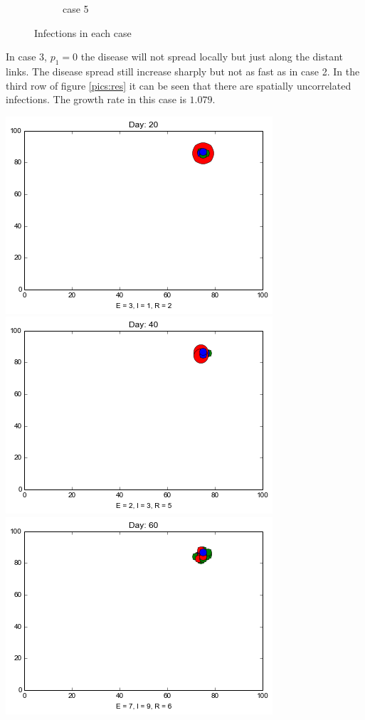 \begin{figure}[!htb]
\begin{subfigure}[b]{0.3\textwidth}
        \caption{case 5}
        \label{e}
    \end{subfigure}
    \caption{Infections in each case}\label{fig5.4}
\end{figure}
\newpage

In case 3, $p_1 = 0$ the disease will not spread locally but just along the distant links. The disease spread still increase sharply but not as fast as in case 2. In the third row of figure \ref{pics:res} it can be seen that there are spatially uncorrelated infections. The growth rate in this case is $1.079$. 


\begin{minipage}{\linewidth}

\centering
\includegraphics[scale=0.28]{images/1t20.png} \quad
\includegraphics[scale=0.28]{images/1t40.png} \quad
\includegraphics[scale=0.28]{images/1t60.png} \quad

\end{minipage}
